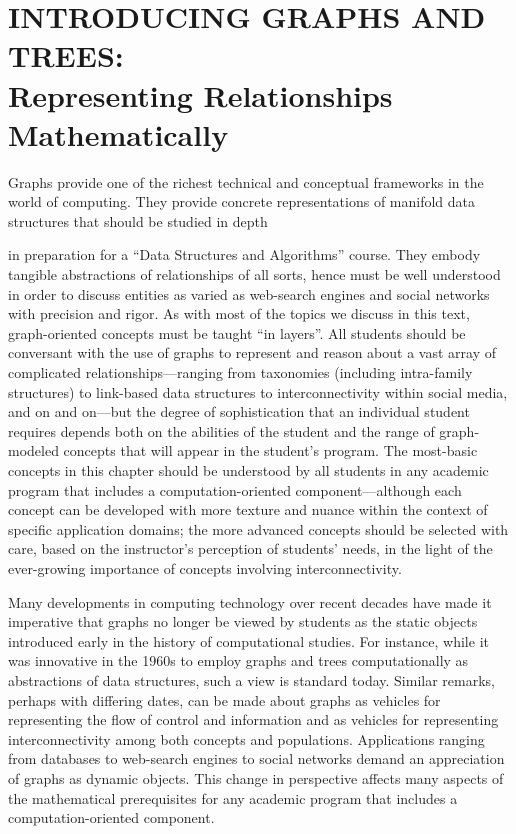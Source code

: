 
\chapter{INTRODUCING GRAPHS AND TREES: \\
Representing Relationships Mathematically}
\label{ch:Graphs-Trees}

Graphs provide one of the richest technical and conceptual frameworks
in the world of computing.  They provide concrete representations of
manifold data structures that should be studied in depth
in preparation for a ``Data Structures and Algorithms'' course.  They
embody tangible abstractions of relationships of all sorts, hence must
be well understood in order to discuss entities as varied as
web-search engines and social networks with precision and rigor.  As
with most of the topics we discuss in this text, graph-oriented
concepts must be taught ``in layers''.  All students should be
conversant with the use of graphs to represent and reason about a vast
array of complicated relationships---ranging from taxonomies
(including intra-family structures) to link-based data structures to
interconnectivity within social media, and on and on---but the degree
of sophistication that an individual student requires depends both on
the abilities of the student and the range of graph-modeled concepts
that will appear in the student's program.  The most-basic concepts in
this chapter should be understood by all students in any academic
program that includes a computation-oriented component---although each
concept can be developed with more texture and nuance within the
context of specific application domains; the more advanced concepts
should be selected with care, based on the instructor's perception of
students' needs, in the light of the ever-growing importance of
concepts involving interconnectivity.

Many developments in computing technology over recent decades have
made it imperative that graphs no longer be viewed by students as the
static objects introduced early in the history of computational
studies.  For instance, while it was innovative in the 1960s to employ
graphs and trees computationally as abstractions of data structures, such a view
is standard today.  Similar remarks, perhaps with differing dates, can
be made about graphs as vehicles for representing the flow of control
and information and as vehicles for representing interconnectivity
among both concepts and populations.  Applications ranging from
databases to web-search engines to social networks demand an
appreciation of graphs as dynamic objects.  This change in perspective
affects many aspects of the mathematical prerequisites for any
academic program that includes a computation-oriented component.

